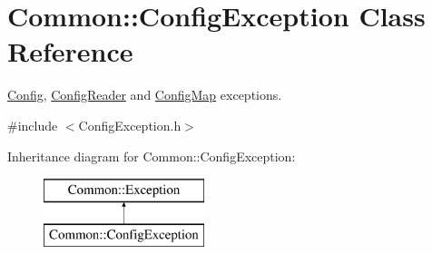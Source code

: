 \hypertarget{class_common_1_1_config_exception}{\section{Common\-:\-:Config\-Exception Class Reference}
\label{class_common_1_1_config_exception}
}


\hyperlink{class_common_1_1_config}{Config}, \hyperlink{class_common_1_1_config_reader}{Config\-Reader} and \hyperlink{class_common_1_1_config_map}{Config\-Map} exceptions.  




{\ttfamily \#include $<$Config\-Exception.\-h$>$}

Inheritance diagram for Common\-:\-:Config\-Exception\-:\begin{figure}[H]
\begin{center}
\leavevmode
\includegraphics[height=2.000000cm]{class_common_1_1_config_exception}
\end{center}
\end{figure}
